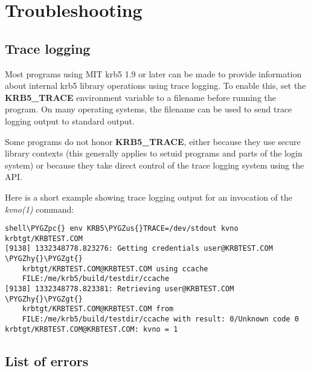 \documentclass[letterpaper,10pt,english]{sphinxmanual}
\def\PYGZus{\char`\_}
\def\PYGZgt{\char`\>}
\def\PYGZpc{\char`\%}
\def\PYGZhy{\char`\-}
\begin{document}
\chapter{Troubleshooting}
\label{admin/troubleshoot:troubleshoot}\label{admin/troubleshoot::doc}\label{admin/troubleshoot:troubleshooting}

\section{Trace logging}
\label{admin/troubleshoot:trace-logging}\label{admin/troubleshoot:id1}
Most programs using MIT krb5 1.9 or later can be made to provide
information about internal krb5 library operations using trace
logging.  To enable this, set the \textbf{KRB5\_TRACE} environment variable
to a filename before running the program.  On many operating systems,
the filename  can be used to send trace logging output
to standard output.

Some programs do not honor \textbf{KRB5\_TRACE}, either because they use
secure library contexts (this generally applies to setuid programs and
parts of the login system) or because they take direct control of the
trace logging system using the API.

Here is a short example showing trace logging output for an invocation
of the \emph{kvno(1)} command:

\begin{Verbatim}[commandchars=\\\{\}]
shell\PYGZpc{} env KRB5\PYGZus{}TRACE=/dev/stdout kvno krbtgt/KRBTEST.COM
[9138] 1332348778.823276: Getting credentials user@KRBTEST.COM \PYGZhy{}\PYGZgt{}
    krbtgt/KRBTEST.COM@KRBTEST.COM using ccache
    FILE:/me/krb5/build/testdir/ccache
[9138] 1332348778.823381: Retrieving user@KRBTEST.COM \PYGZhy{}\PYGZgt{}
    krbtgt/KRBTEST.COM@KRBTEST.COM from
    FILE:/me/krb5/build/testdir/ccache with result: 0/Unknown code 0
krbtgt/KRBTEST.COM@KRBTEST.COM: kvno = 1
\end{Verbatim}


\section{List of errors}
\label{admin/troubleshoot:list-of-errors}
\end{document}
